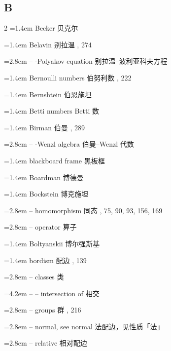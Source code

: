\subsection*{B}
\small
\begin{multicols}{2}
\noindent\hangindent=1.4em Becker \quad 贝克尔 \par
\noindent\hangindent=1.4em Belavin \quad 别拉温 , 274\par
\noindent\hangindent=2.8em -- -Polyakov equation \quad 别拉温--波利亚科夫方程 \par
\noindent\hangindent=1.4em Bernoulli numbers \quad 伯努利数 , 222\par
\noindent\hangindent=1.4em Bernshtein \quad 伯恩施坦 \par
\noindent\hangindent=1.4em Betti numbers \quad Betti 数 \par
\noindent\hangindent=1.4em Birman \quad 伯曼 , 289\par
\noindent\hangindent=2.8em -- -Wenzl algebra \quad 伯曼--Wenzl 代数 \par
\noindent\hangindent=1.4em blackboard frame \quad 黑板框 \par
\noindent\hangindent=1.4em Boardman \quad 博德曼 \par
\noindent\hangindent=1.4em Bockstein \quad 博克施坦 \quad\par
\noindent\hangindent=2.8em -- homomorphism \quad 同态 , 75, 90, 93, 156, 169\par
\noindent\hangindent=2.8em -- operator \quad 算子 \par
\noindent\hangindent=1.4em Boltyanskii \quad 博尔强斯基 \par
\noindent\hangindent=1.4em bordism \quad 配边 , 139\par
\noindent\hangindent=2.8em -- classes \quad 类 \quad\par
\noindent\hangindent=4.2em -- -- intersection of \quad 相交 \par
\noindent\hangindent=2.8em -- groups \quad 群 , 216\par
\noindent\hangindent=2.8em -- normal, see normal \quad 法配边，见性质「法」 \quad\par
\noindent\hangindent=2.8em -- relative \quad 相对配边 \par

\end{multicols}
